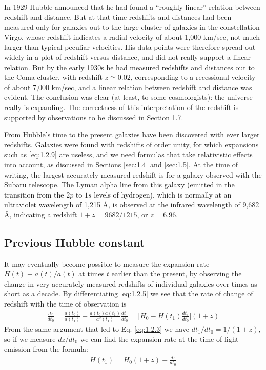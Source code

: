 \documentclass[11pt,a4paper,dvipdfmx]{jsarticle}
\theoremstyle{plain}
\theoremstyle{break}
\begin{document}
In 1929 Hubble announced that he had found a “roughly linear” relation between redshift and distance.
But at that time redshifts and distances had been measured only for galaxies out to the large cluster of galaxies in the constellation Virgo, whose redshift indicates a radial velocity of about 1,000 km/sec, not much larger than typical peculiar velocities.
His data points were therefore spread out widely in a plot of redshift versus distance, and did not really support a linear relation.
But by the early 1930s he had measured redshifts and distances out to the Coma cluster, with redshift $z \simeq 0.02$, corresponding to a recessional velocity of about 7,000 km/sec, and a linear relation between redshift and distance was evident.
The conclusion was clear (at least, to some cosmologists): the universe really is expanding.
The correctness of this interpretation of the redshift is supported by observations to be discussed in Section 1.7.

From Hubble’s time to the present galaxies have been discovered with ever larger redshifts. Galaxies were found with redshifts of order unity, for which expansions such as \ref{eq:1.2.9} are useless, and we need formulas that take relativistic effects into account, as discussed in Sections \ref{sec:1.4} and \ref{sec:1.5}. At the time of writing, the largest accurately measured redshift is for a galaxy observed with the Subaru telescope.
The Lyman alpha line from this galaxy (emitted in the transition from the $2p$ to $1s$ levels of hydrogen), which is normally at an ultraviolet wavelength of 1,215 \AA, is observed at the infrared wavelength of 9,682 \AA, indicating a redshift $1 + z = 9682/1215$, or $z = 6.96$.

\subsection{Previous Hubble constant}
It may eventually become possible to measure the expansion rate $H (t) \equiv \dot{a}(t)/a(t)$ at times $t$ earlier than the present, by observing the change in very accurately measured redshifts of individual galaxies over times as short as a decade.
By differentiating \eqref{eq:1.2.5} we see that the rate of change of redshift with the time of observation is
\begin{align}
  \frac{dz}{dt_0} = \frac{\dot{a}(t_0)}{a(t_1)} - \frac{a(t_0) \dot{a}(t_1)}{a^2(t_1)} \frac{dt_1}{dt_0} = \Big[H_0 - H(t_1) \frac{dt_1}{dt_0}\Big] (1+z)
\end{align}
From the same argument that led to Eq. \eqref{eq:1.2.3} we have $dt_1/dt_0 = 1/(1+z)$, so if we measure $dz/dt_0$ we can find the expansion rate at the time of light emission from the formula:
\begin{align}
  H(t_1) = H_0(1+z) - \frac{dz}{dt_0} \label{eq:1.2.10}
\end{align}
\end{document}
